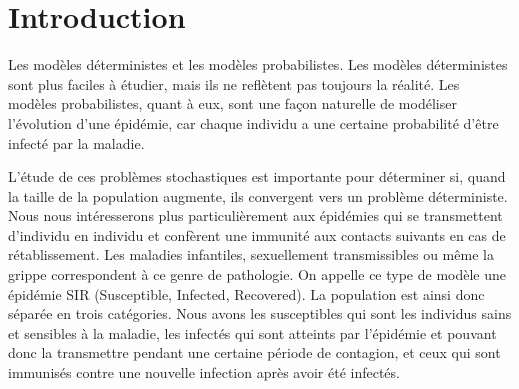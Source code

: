 \chapter{Introduction}

Les modèles déterministes et les modèles probabilistes. Les modèles déterministes sont plus faciles à étudier, mais ils ne reflètent pas toujours la réalité. Les modèles probabilistes, quant à eux, sont une façon naturelle de modéliser l’évolution d’une épidémie, car chaque individu a une certaine probabilité d’être infecté par la maladie.

L’étude de ces problèmes stochastiques est importante pour déterminer si, quand la taille de la population augmente, ils convergent vers un problème déterministe. Nous nous intéresserons plus particulièrement aux épidémies qui se transmettent d’individu en individu et confèrent une immunité aux contacts suivants en cas de rétablissement. Les maladies infantiles, sexuellement transmissibles ou même la grippe correspondent à ce genre de pathologie. On appelle ce type de modèle une épidémie SIR (Susceptible, Infected, Recovered). La population est ainsi donc séparée en trois catégories. Nous avons les susceptibles qui sont les individus sains et sensibles à la maladie, les infectés qui sont atteints par l’épidémie et pouvant donc la transmettre pendant une certaine période de contagion, et ceux qui sont immunisés contre une nouvelle infection après avoir été infectés.
